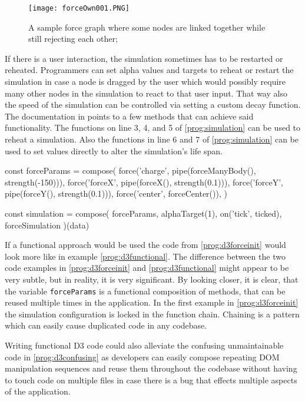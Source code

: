 \begin{figure}
  \centering
  \texttt{[image: forceOwn001.PNG]}
  \caption{A sample force graph where some nodes are linked together while still rejecting each other;}
  \label{fig:force005}
\end{figure}

If there is a user interaction, the simulation sometimes has to be restarted or reheated. Programmers can set alpha values and targets to reheat or restart the simulation in case a node is dragged by the user which would possibly require many other nodes in the simulation to react to that user input. That way also the speed of the simulation can be controlled via setting a custom decay function. The documentation in \cite[/d3-force/blob/master/README.md]{D3Github} points to a few methods that can achieve said functionality. The functions on line 3, 4, and 5 of \ref{prog:simulation} can be used to reheat a simulation. Also the functions in line 6 and 7 of \ref{prog:simulation} can be used to set values directly to alter the simulation's life span.

\begin{program}
\caption{D3 written in a fictional functional way}
\label{prog:d3functional}
\begin{JsCode}
  
const forceParams = compose(
  force('charge', pipe(forceManyBody(), strength(-150))),
  force('forceX', pipe(forceX(), strength(0.1))),
  force('forceY', pipe(forceY(), strength(0.1))),
  force('center', forceCenter()),
)

const simulation = compose(
  forceParams,
  alphaTarget(1),
  on('tick', ticked),
  forceSimulation
)(data)
\end{JsCode}
\end{program}

If a functional approach would be used the code from \ref{prog:d3forceinit} would look more like in example \ref{prog:d3functional}. The difference between the two code examples in \ref{prog:d3forceinit} and \ref{prog:d3functional} might appear to be very subtle, but in reality, it is very significant. By looking closer, it is clear, that the variable \texttt{forceParams} is a functional composition of methods, that can be reused multiple times in the application. In the first example in \ref{prog:d3forceinit} the simulation configuration is locked in the function chain. Chaining is a pattern which can easily cause duplicated code in any codebase. 

Writing functional D3 code could also alleviate the confusing unmaintainable code in \ref{prog:d3confusing} as developers can easily compose repeating DOM manipulation sequences and reuse them throughout the codebase without having to touch code on multiple files in case there is a bug that effects multiple aspects of the application.
